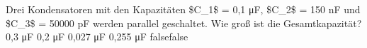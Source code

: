     {Drei Kondensatoren mit den Kapazitäten \$C\_1\$ = 0,1 μF, \$C\_2\$ = 150 nF und \$C\_3\$ = 50000 pF werden parallel geschaltet. Wie groß ist die Gesamtkapazität?}
    {0,3 μF}
    {0,2 μF}
    {0,027 μF}
    {0,255 μF}
    {false}{false}